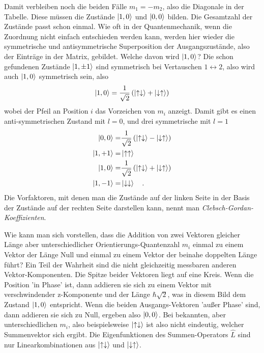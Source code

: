 Damit verbleiben noch die beiden Fälle $m_1 = - m_2$, also die Diagonale in der Tabelle. Diese müssen die Zustände $\ket{1, 0}$ und $\ket{0,0}$ bilden. Die Gesamtzahl der Zustände passt schon einmal. Wie oft in der Quantenmechanik, wenn die Zuordnung nicht einfach entschieden werden kann, werden hier wieder die symmetrische und antisymmetrische Superposition der Ausgangszustände, also der Einträge in der Matrix, gebildet. Welche davon wird $\ket{1, 0}$? Die schon gefundenen Zustände $\ket{1, \pm 1} $ sind symmetrisch bei Vertauschen $1 \leftrightarrow 2$, also wird auch $\ket{1, 0}$ symmetrisch sein, also 
\begin{equation}
\ket{1, 0} = \frac{1}{\sqrt{2}} \left( \ket{\uparrow \downarrow} +  \ket{\downarrow \uparrow} \right)
\end{equation}
wobei der Pfeil an Position $i$ das Vorzeichen von $m_i$ anzeigt.
Damit gibt es einen anti-symmetrischen Zustand mit $l = 0$, und drei symmetrische mit $l=1$
\begin{align}
\ket{0, 0} = & \frac{1}{\sqrt{2}} \left( \ket{\uparrow \downarrow} -  \ket{\downarrow \uparrow} \right) \\
\ket{1, +1} =& \ket{\uparrow \uparrow}  \\
\ket{1, 0} = &\frac{1}{\sqrt{2}} \left( \ket{\uparrow \downarrow} +  \ket{\downarrow \uparrow} \right) \\
\ket{1, -1} = &\ket{\downarrow \downarrow}    \quad .
\end{align}
Die Vorfaktoren, mit denen man die Zustände auf der linken Seite in der Basis der Zustände auf der rechten Seite darstellen kann, nennt man \emph{Clebsch-Gordan-Koeffizienten}. 

Wie kann man sich vorstellen, dass die Addition von zwei Vektoren gleicher Länge aber unterschiedlicher Orientierungs-Quantenzahl $m_i$ einmal zu einem Vektor der Länge Null und einmal zu einem Vektor der beinahe doppelten Länge führt? Ein Teil der Wahrheit sind die nicht gleichzeitig messbaren anderen Vektor-Komponenten. Die Spitze beider Vektoren liegt auf eine Kreis. Wenn die Position 'in Phase' ist, dann addieren sie sich zu einem Vektor mit verschwindender z-Komponente und der Länge $\hbar \sqrt{2}$, was in diesem Bild dem Zustand $\ket{1,0}$ entspricht. Wenn die beiden Ausgangs-Vektoren 'außer Phase' sind, dann addieren sie sich zu Null, ergeben also  $\ket{0,0}$. Bei bekannten, aber unterschiedlichen $m_i$, also beispielsweise $\ket{\uparrow \downarrow}$ ist also nicht eindeutig, welcher Summenvektor sich ergibt. Die Eigenfunktionen des Summen-Operators $\hat{L}$ sind nur Linearkombinationen aus $\ket{\uparrow \downarrow}$ und $\ket{\downarrow \uparrow}$.

